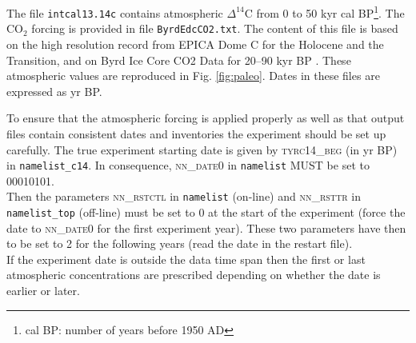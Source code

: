 \documentclass[../main/TOP_manual]{subfiles}
\newcommand{\cd}{\mathrm{CO_2}}
\newcommand{\Dcq}{\Delta ^{14}\mathrm{C}}
\newcommand{\CODE}[1]{\textsc{#1}}
\begin{document}
The file \texttt{intcal13.14c} \citep{reimer_2013} contains atmospheric $\Dcq$ from 0 to 50 kyr cal BP\footnote{cal BP: number of years before 1950 AD}.
The $\cd$ forcing is provided in file \texttt{ByrdEdcCO2.txt}. The content of this file is based on  the high resolution record from EPICA Dome C \citep{monnin_2004} for the Holocene and the Transition, and on Byrd Ice Core CO2 Data for 20--90 kyr BP  \citep{ahn_2008}. These atmospheric values are reproduced in Fig. \ref{fig:paleo}. Dates in these files are expressed as yr BP.

To ensure that the atmospheric forcing is applied properly as well as that output files contain consistent dates and inventories the experiment should be set up carefully.
The true experiment starting date is given by \CODE{tyrc14\_beg} (in yr BP) in \texttt{namelist\_c14}. In consequence, \CODE{nn\_date0} in \texttt{namelist} MUST be set to 00010101.\\
Then the parameters \CODE{nn\_rstctl} in  \texttt{namelist} (on-line) and \CODE{nn\_rsttr} in \texttt{namelist\_top} (off-line)  must be set to 0 at the start of the experiment (force the date to \CODE{nn\_date0} for the first experiment year). These two parameters have then to be set to 2 for the following years (read the date in the restart file). \\
 If the experiment date is outside the data time span then the first or last atmospheric concentrations are prescribed depending on whether the date is earlier or later.

%
\end{document}
